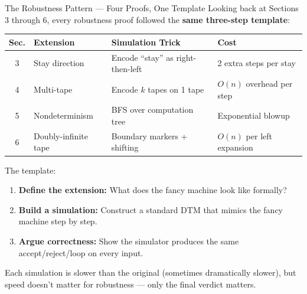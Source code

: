 \begin{conceptbox}{{The Robustness Pattern --- Four Proofs, One Template}}
Looking back at Sections 3 through 6, every robustness proof followed the
\textbf{same three-step template}:

\begin{center}
\renewcommand{\arraystretch}{1.4}
\begin{tabular}{clll}
\toprule
\textbf{Sec.} & \textbf{Extension} & \textbf{Simulation Trick} & \textbf{Cost} \\
\midrule
3 & Stay direction & Encode ``stay'' as right-then-left & 2 extra steps per stay \\
4 & Multi-tape & Encode $k$ tapes on 1 tape & $O(n)$ overhead per step \\
5 & Nondeterminism & BFS over computation tree & Exponential blowup \\
6 & Doubly-infinite tape & Boundary markers + shifting & $O(n)$ per left expansion \\
\bottomrule
\end{tabular}
\end{center}

The template:
\begin{enumerate}[nosep]
\item \textbf{Define the extension:} What does the fancy machine look like formally?
\item \textbf{Build a simulation:} Construct a standard DTM that mimics the fancy machine step by step.
\item \textbf{Argue correctness:} Show the simulator produces the same accept/reject/loop on every input.
\end{enumerate}

Each simulation is slower than the original (sometimes dramatically slower),
but speed doesn't matter for robustness --- only the final verdict matters.

\end{conceptbox}
